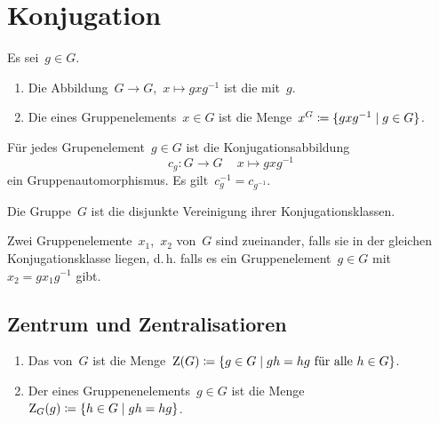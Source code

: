 \section{Konjugation}

\begin{definition}
  Es sei~$g \in G$.
  \begin{enumerate}
    \item
      Die Abbildung~$G \to G$,~$x \mapsto g x g^{-1}$ ist die  mit~$g$.
    \item
      Die  eines Gruppenelements~$x \in G$ ist die Menge~$x^G \defined \{ g x g^{-1} \suchthat g \in G \}$.
  \end{enumerate}
\end{definition}

\begin{proposition}
  Für jedes Grupenelement~$g \in G$ ist die Konjugationsabbildung
  \[
    c_g
    \colon
    G \to G \,
    \quad
    x \mapsto g x g^{-1}
  \]
  ein Gruppenautomorphismus.
  Es gilt~$c_g^{-1} = c_{g^{-1}}$.
\end{proposition}

\begin{proposition}
  Die Gruppe~$G$ ist die disjunkte Vereinigung ihrer Konjugationsklassen.
\end{proposition}

\begin{definition}
  Zwei Gruppenelemente~$x_1$,~$x_2$ von~$G$ sind  zueinander, falls sie in der gleichen Konjugationsklasse liegen, d.\,h. falls es ein Gruppenelement~$g \in G$ mit~$x_2 = g x_1 g^{-1}$ gibt.
\end{definition}



\subsection{Zentrum und Zentralisatioren}

\begin{definition}
  \leavevmode
  \begin{enumerate}
    \item
      Das  von~$G$ ist die Menge~$\zenter(G) \defined \{ g \in G \suchthat \text{$g h = h g$ für alle~$h \in G$} \}$.
    \item
      Der  eines Gruppenenelements~$g \in G$ ist die Menge~$\zentralizer_G(g) \defined \{ h \in G \suchthat gh = hg \}$.
  \end{enumerate}
\end{definition}

